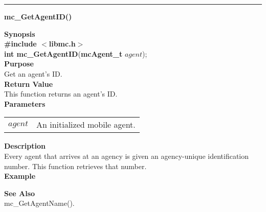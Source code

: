 \noindent
\vspace{5pt}
\rule{6.5in}{0.015in}
\noindent
{}
{\LARGE \bf mc\_GetAgentID()}\\
\label{api:mc_GetAgentID()}

\noindent
{\bf Synopsis}\\
{\bf \#include $<$libmc.h$>$}\\
{\bf int mc\_GetAgentID}({\bf mcAgent\_t} $agent$);\\

\noindent
{\bf Purpose}\\
Get an agent's ID. \\

\noindent
{\bf Return Value}\\
This function returns an agent's ID. \\

\noindent
{\bf Parameters}
\vspace{-0.1in}
\begin{description}
\item
\begin{tabular}{p{10 mm}p{145 mm}} 
$agent$ & An initialized mobile agent.
\end{tabular}
\end{description}

\noindent
{\bf Description}\\
Every agent that arrives at an agency is given an agency-unique 
identification number. This function retrieves that number.  \\

\noindent
{\bf Example}\\
\noindent
{\footnotesize}

\noindent
{\bf See Also}\\
mc\_GetAgentName().

